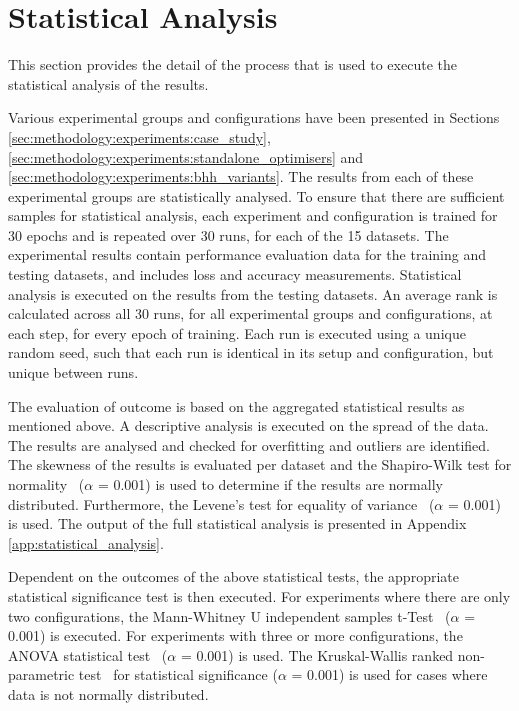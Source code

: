 \section{Statistical Analysis}
\label{sec:methodology:statistical_analysis}

This section provides the detail of the process that is used to execute the statistical analysis of the results.

Various experimental groups and configurations have been presented in Sections \ref{sec:methodology:experiments:case_study}, \ref{sec:methodology:experiments:standalone_optimisers} and \ref{sec:methodology:experiments:bhh_variants}. The results from each of these experimental groups are statistically analysed. To ensure that there are sufficient samples for statistical analysis, each experiment and configuration is trained for 30 epochs and is repeated over 30 runs, for each of the 15 datasets. The experimental results contain performance evaluation data for the training and testing datasets, and includes loss and accuracy measurements. Statistical analysis is executed on the results from the testing datasets. An average rank is calculated across all 30 runs, for all experimental groups and configurations, at each step, for every epoch of training. Each run is executed using a unique random seed, such that each run is identical in its setup and configuration, but unique between runs.

The evaluation of outcome is based on the aggregated statistical results as mentioned above. A descriptive analysis is executed on the spread of the data. The results are analysed and checked for overfitting and outliers are identified. The skewness of the results is evaluated per dataset and the Shapiro-Wilk test for normality~\cite{ref:shapiro:1965} ($\alpha$ = 0.001) is used to determine if the results are normally distributed. Furthermore, the Levene's test for equality of variance~\cite{ref:levene:1961} ($\alpha$ = 0.001) is used. The output of the full statistical analysis is presented in Appendix \ref{app:statistical_analysis}.

Dependent on the outcomes of the above statistical tests, the appropriate statistical significance test is then executed. For experiments where there are only two configurations, the Mann-Whitney U independent samples t-Test~\cite{ref:mann:1947} ($\alpha$ = 0.001) is executed. For experiments with three or more configurations, the \acs{ANOVA} statistical test~\cite{ref:fisher:1921} ($\alpha$ = 0.001) is used. The Kruskal-Wallis ranked non-parametric test~\cite{ref:kruskal:1952} for statistical significance ($\alpha$ = 0.001) is used for cases where data is not normally distributed.

